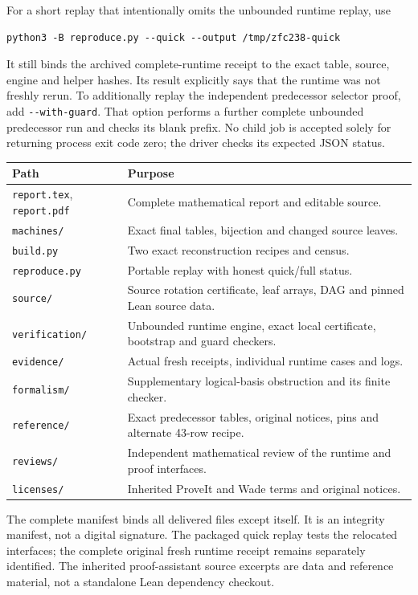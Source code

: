 \documentclass[11pt]{article}
\theoremstyle{definition}\newtheorem{definition}[theorem]{Definition}
\newcommand{\file}[1]{\nolinkurl{#1}}
\begin{document}
For a short replay that intentionally omits the unbounded runtime replay,
use
\begin{verbatim}
python3 -B reproduce.py --quick --output /tmp/zfc238-quick
\end{verbatim}
It still binds the archived complete-runtime receipt to the exact table,
source, engine and helper hashes.  Its result explicitly says that the
runtime was not freshly rerun.  To additionally replay the independent
predecessor selector proof, add \file{--with-guard}.  That option performs
a further complete unbounded predecessor run and checks its blank prefix.
No child job is accepted solely for returning process exit code zero;
the driver checks its expected JSON status.

\begin{center}
\begin{tabularx}{\textwidth}{@{}lX@{}}
\toprule
Path & Purpose\\
\midrule
\file{report.tex}, \file{report.pdf} & Complete mathematical report and editable source.\\
\file{machines/} & Exact final tables, bijection and changed source leaves.\\
\file{build.py} & Two exact reconstruction recipes and census.\\
\file{reproduce.py} & Portable replay with honest quick/full status.\\
\file{source/} & Source rotation certificate, leaf arrays, DAG and pinned Lean source data.\\
\file{verification/} & Unbounded runtime engine, exact local certificate, bootstrap and guard checkers.\\
\file{evidence/} & Actual fresh receipts, individual runtime cases and logs.\\
\file{formalism/} & Supplementary logical-basis obstruction and its finite checker.\\
\file{reference/} & Exact predecessor tables, original notices, pins and alternate 43-row recipe.\\
\file{reviews/} & Independent mathematical review of the runtime and proof interfaces.\\
\file{licenses/} & Inherited ProveIt and Wade terms and original notices.\\
\bottomrule
\end{tabularx}
\end{center}

The complete manifest binds all delivered files except itself.  It is an
integrity manifest, not a digital signature.  The packaged quick replay
tests the relocated interfaces; the complete original fresh runtime
receipt remains separately identified.  The inherited proof-assistant
source excerpts are data and reference material, not a standalone Lean
dependency checkout.
\end{document}
